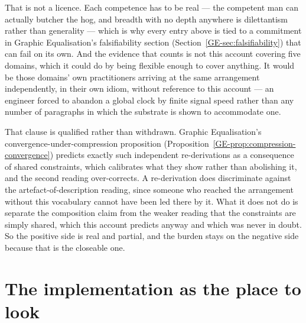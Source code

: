 \documentclass[11pt,a4paper]{article}
\begin{document}
That is not a licence. Each competence has to be real --- the competent man can
actually butcher the hog, and breadth with no depth anywhere is dilettantism rather than generality
--- which is why every entry above is tied to a commitment in Graphic Equalisation's falsifiability section
(Section~\ref{GE-sec:falsifiability}) that
can fail on its own. And the evidence that counts is not this account covering five domains, which it
could do by being flexible enough to cover anything. It would be those domains' own practitioners arriving
at the same arrangement independently, in their own idiom, without reference to this account --- an
engineer forced to abandon a global clock by finite signal speed rather than any number of paragraphs
in which the substrate is shown to accommodate one.

That clause is qualified rather than withdrawn. Graphic Equalisation's convergence-under-compression
proposition (Proposition~\ref{GE-prop:compression-convergence}) predicts exactly such
independent re-derivations as a consequence of shared constraints, which calibrates what they show
rather than abolishing it, and the second reading over-corrects. A re-derivation does discriminate against the artefact-of-description reading, since someone who reached
the arrangement without this vocabulary cannot have been led there by it. What it does not do is
separate the composition claim from the weaker reading that the constraints are simply shared, which
this account predicts anyway and which was never in doubt. So the positive side is real and partial,
and the burden stays on the negative side because that is the closeable one.

\section{The implementation as the place to look}\label{sec:implementation}
\end{document}
